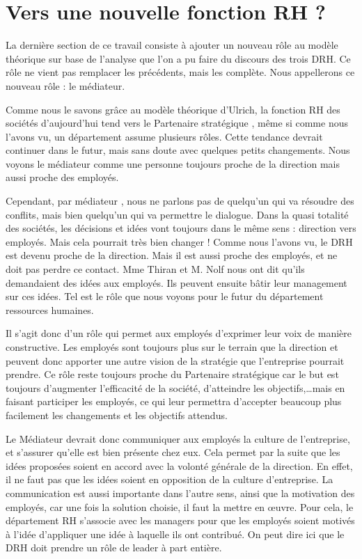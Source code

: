 \section{Vers une nouvelle fonction RH ?}

La dernière section de ce travail consiste à ajouter un nouveau rôle au modèle théorique sur base de l'analyse que l'on a pu faire du discours des trois DRH. Ce rôle ne vient pas remplacer les précédents, mais les complète.  Nous appellerons ce nouveau rôle : le \og{}médiateur\fg{}.\newline

Comme nous le savons grâce au modèle théorique d'Ulrich, la fonction RH des sociétés d'aujourd'hui tend vers le \og{}Partenaire stratégique \fg{}, même si comme nous l'avons vu, un département assume plusieurs rôles. Cette tendance devrait continuer dans le futur, mais sans doute avec quelques petits changements. Nous voyons le médiateur comme une personne toujours proche de la direction mais aussi proche des employés. \newline

Cependant, par \og{}médiateur \fg{}, nous ne parlons pas de quelqu'un qui va résoudre des conflits, mais bien quelqu'un qui va permettre le dialogue. Dans la quasi totalité des sociétés, les décisions et idées vont toujours dans le même sens : direction vers employés. Mais cela pourrait très bien changer ! Comme nous l'avons vu, le DRH est devenu proche de la direction. Mais il est aussi proche des employés, et ne doit pas perdre ce contact. Mme Thiran et M. Nolf nous ont dit qu'ils demandaient des idées aux employés. Ils peuvent ensuite bâtir leur management sur ces idées. Tel est le rôle que nous voyons pour le futur du département ressources humaines. \newline

Il s'agit donc d'un rôle qui permet aux employés d'exprimer leur voix de manière constructive. Les employés sont toujours plus sur le terrain que la direction et peuvent donc apporter une autre vision de la stratégie que l'entreprise pourrait prendre. Ce rôle reste toujours proche du \og{}Partenaire stratégique \fg{} car le but est toujours d'augmenter l'efficacité de la société, d'atteindre les objectifs,\ldots mais en faisant participer les employés, ce qui leur permettra d'accepter beaucoup plus facilement les changements et les objectifs attendus.\newline

Le \og{}Médiateur\fg{} devrait donc communiquer aux employés la culture de l'entreprise, et s'assurer qu'elle est bien présente chez eux. Cela permet par la suite que les idées proposées soient en accord avec la volonté générale de la direction. En effet, il ne faut pas que les idées soient en opposition de la culture d'entreprise. La communication est aussi importante dans l'autre sens, ainsi que la motivation des employés, car une fois la solution choisie, il faut la mettre en \oe{}uvre. Pour cela, le département RH s'associe avec les managers pour que les employés soient motivés à l'idée d'appliquer une idée à laquelle ils ont contribué. On peut dire ici que le DRH doit prendre un rôle de leader à part entière. \newline

